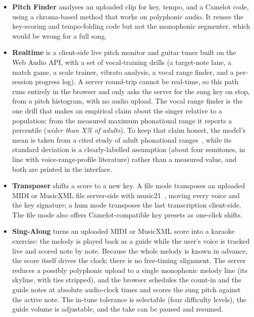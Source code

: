 \documentclass[12pt,a4paper]{article}
\begin{document}
\begin{itemize}
    \item \textbf{Pitch Finder} analyses an uploaded clip for key, tempo, and a
    Camelot code, using a chroma-based method that works on polyphonic audio.
    It reuses the key-scoring and tempo-folding code but not the monophonic
    segmenter, which would be wrong for a full song.
    \item \textbf{Realtime} is a client-side live pitch monitor and guitar
    tuner built on the Web Audio API, with a set of vocal-training drills (a
    target-note lane, a match game, a scale trainer, vibrato analysis, a vocal
    range finder, and a per-session progress log). A server round-trip cannot
    be real-time, so this path runs entirely in the browser and only asks the
    server for the sung key on stop, from a pitch histogram, with no audio
    upload. The vocal range finder is the one drill that makes an empirical
    claim about the singer relative to a population: from the measured maximum
    phonational range it reports a percentile (\emph{wider than X\% of adults}).
    To keep that claim honest, the model's mean is taken from a cited study of
    adult phonational ranges~\cite{hollien}, while its standard deviation is a
    clearly-labelled assumption (about four semitones, in line with
    voice-range-profile literature) rather than a measured value, and both are
    printed in the interface.
    \item \textbf{Transposer} shifts a score to a new key. A file mode
    transposes an uploaded MIDI or MusicXML file server-side with
    music21~\cite{music21}, moving every voice and the key signature; a hum
    mode transposes the last transcription client-side. The file mode also
    offers Camelot-compatible key presets as one-click shifts.
    \item \textbf{Sing-Along} turns an uploaded MIDI or MusicXML score into a
    karaoke exercise: the melody is played back as a guide while the user's
    voice is tracked live and scored note by note. Because the whole melody is
    known in advance, the score itself drives the clock; there is no free-timing
    alignment. The server reduces a possibly polyphonic upload to a single
    monophonic melody line (its skyline, with ties stripped), and the browser
    schedules the count-in and the guide notes at absolute audio-clock times and
    scores the sung pitch against the active note. The in-tune tolerance is
    selectable (four difficulty levels), the guide volume is adjustable, and the
    take can be paused and resumed.

\end{itemize}
\end{document}
